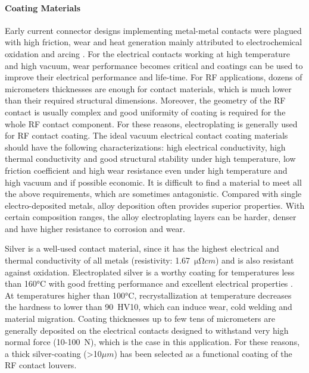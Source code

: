 {\paragraph{Coating Materials}
Early current connector designs implementing metal-metal contacts were plagued with high friction, wear and heat generation mainly attributed to electrochemical oxidation and arcing . For the electrical contacts working at high temperature and high vacuum, wear performance becomes critical and coatings can be used to improve their electrical performance and life-time. For RF applications, dozens of micrometers thicknesses are enough for contact materials, which is much lower than their required structural dimensions. Moreover, the geometry of the RF contact is usually complex and good uniformity of coating is required for the whole RF contact component. For these reasons, electroplating is generally used for RF contact coating.  
The ideal vacuum electrical contact coating materials should have the following characterizations: high electrical conductivity, high thermal conductivity and good structural stability under high temperature, low friction coefficient and high wear resistance even under high temperature and high vacuum and if possible economic. It is difficult to find a material to meet all the above requirements, which are sometimes antagonistic. Compared with single electro-deposited metals, alloy deposition often provides superior properties. With certain composition ranges, the alloy electroplating layers can be harder, denser and have higher resistance to corrosion and wear. 

Silver is a well-used contact material, since it has the highest electrical and thermal conductivity of all metals (resistivity: 1.67~$\si{\micro \ohm cm}$) and is also resistant against oxidation. Electroplated silver is a worthy coating for temperatures less than 160$\si{\degreeCelsius}$ with good fretting performance and excellent electrical properties . At temperatures higher than 100$\si{\degreeCelsius}$, recrystallization at temperature decreases the hardness to lower than 90~HV10, which can induce wear, cold welding and material migration. Coating thicknesses up to few tens of micrometers are generally deposited on the electrical contacts designed to withstand very high normal force (10-100~N), which is the case in this application. For these reasons, a thick silver-coating (>10$\si{\mu m}$) has been selected as a functional coating of the RF contact louvers.

}

